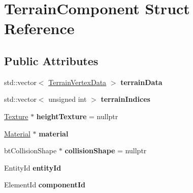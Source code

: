 \hypertarget{struct_terrain_component}{}\section{Terrain\+Component Struct Reference}
\label{struct_terrain_component}
\subsection*{Public Attributes}
\begin{DoxyCompactItemize}
\item 
\hypertarget{struct_terrain_component_a2a0f475fefcd59a27ba8364d397d0290}{}std\+::vector$<$ \hyperlink{struct_terrain_vertex_data}{Terrain\+Vertex\+Data} $>$ {\bfseries terrain\+Data}\label{struct_terrain_component_a2a0f475fefcd59a27ba8364d397d0290}

\item 
\hypertarget{struct_terrain_component_acfd3001b31459d14944f9c00f4a96786}{}std\+::vector$<$ unsigned int $>$ {\bfseries terrain\+Indices}\label{struct_terrain_component_acfd3001b31459d14944f9c00f4a96786}

\item 
\hypertarget{struct_terrain_component_acd777157fcd33430b38d7a1c71bdc338}{}\hyperlink{struct_texture}{Texture} $\ast$ {\bfseries height\+Texture} = nullptr\label{struct_terrain_component_acd777157fcd33430b38d7a1c71bdc338}

\item 
\hypertarget{struct_terrain_component_af4b0860f724b66135813dba761d0bf97}{}\hyperlink{struct_material}{Material} $\ast$ {\bfseries material}\label{struct_terrain_component_af4b0860f724b66135813dba761d0bf97}

\item 
\hypertarget{struct_terrain_component_a2cdc200c35bb00265f21db10a9df4470}{}bt\+Collision\+Shape $\ast$ {\bfseries collision\+Shape} = nullptr\label{struct_terrain_component_a2cdc200c35bb00265f21db10a9df4470}

\item 
\hypertarget{struct_terrain_component_a4ffee7106d10b44c6025ca2dcc3c9ae8}{}Entity\+Id {\bfseries entity\+Id}\label{struct_terrain_component_a4ffee7106d10b44c6025ca2dcc3c9ae8}

\item 
\hypertarget{struct_terrain_component_a377ad2a5de993981a686b9251e95b290}{}Element\+Id {\bfseries component\+Id}\label{struct_terrain_component_a377ad2a5de993981a686b9251e95b290}


\end{DoxyCompactItemize}
